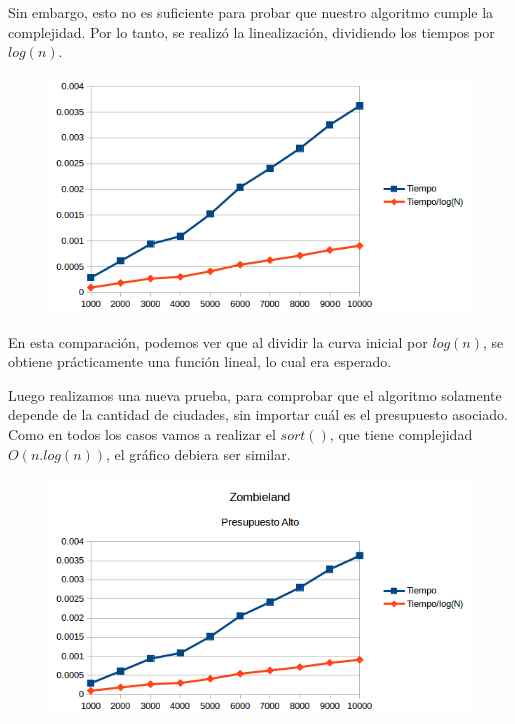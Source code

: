 Sin embargo, esto no es suficiente para probar que nuestro algoritmo cumple la complejidad. Por lo tanto, se realiz\'o la linealizaci\'on, dividiendo los tiempos por $log(n)$.

\newpage

 \begin{figure}[h!]
   \begin{center}
 	\includegraphics{imagenes/ej1/Mediciones/Grafico2.png}
   \end{center}
 \end{figure}

 En esta comparaci\'on, podemos ver que al dividir la curva inicial por $log(n)$, se obtiene pr\'acticamente una funci\'on lineal, lo cual era esperado.
 
Luego realizamos una nueva prueba, para comprobar que el algoritmo solamente depende de la cantidad de ciudades, sin importar cu\'al es el presupuesto asociado.
Como en todos los casos vamos a realizar el $sort()$, que tiene complejidad $O(n.log(n))$, el gr\'afico debiera ser similar.

 \begin{figure}[h!]
   \begin{center}
 	\includegraphics{imagenes/ej1/Mediciones/Grafico3.png}
   \end{center}
 \end{figure}

